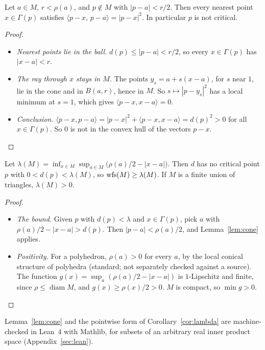 \begin{lemma}\label{lem:cone}
Let $a\in M$, $r<\rho(a)$, and $p\notin M$ with $|p-a|<r/2$. Then every nearest point $x\in\Gamma(p)$ satisfies
$\langle p-x,\,p-a\rangle=|p-x|^2$. In particular $p$ is not critical.
\end{lemma}
\begin{proof}
\begin{itemize}
\item \emph{Nearest points lie in the ball.} $d(p)\le|p-a|<r/2$, so every $x\in\Gamma(p)$ has $|x-a|<r$.
\item \emph{The ray through $x$ stays in $M$.} The points $y_s=a+s(x-a)$, for $s$ near $1$, lie in the cone and
in $B(a,r)$, hence in $M$. So $s\mapsto|p-y_s|^2$ has a local minimum at $s=1$, which gives $\langle
p-x,x-a\rangle=0$.
\item \emph{Conclusion.} $\langle p-x,p-a\rangle=|p-x|^2+\langle p-x,x-a\rangle=d(p)^2>0$ for all
$x\in\Gamma(p)$. So $0$ is not in the convex hull of the vectors $p-x$.
\end{itemize}
\end{proof}

\begin{corollary}\label{cor:lambda}
Let $\lambda(M)=\inf_{x\in M}\sup_{a\in M}\bigl(\rho(a)/2-|x-a|\bigr)$. Then $d$ has no critical point $p$ with
$0<d(p)<\lambda(M)$, so $\operatorname{wfs}(M)\ge\lambda(M)$. If $M$ is a finite union of triangles, $\lambda(M)>0$.
\end{corollary}
\begin{proof}
\begin{itemize}
\item \emph{The bound.} Given $p$ with $d(p)<\lambda$ and $x\in\Gamma(p)$, pick $a$ with
$\rho(a)/2-|x-a|>d(p)$. Then $|p-a|<\rho(a)/2$, and Lemma~\ref{lem:cone} applies.
\item \emph{Positivity.} For a polyhedron, $\rho(a)>0$ for every $a$, by the local conical structure of
polyhedra (standard; not separately checked against a source). The function $g(x)=\sup_a(\rho(a)/2-|x-a|)$
is $1$-Lipschitz and finite, since $\rho\le\operatorname{diam}M$, and $g(x)\ge\rho(x)/2>0$. $M$ is compact, so
$\min g>0$.
\end{itemize}
\end{proof}

Lemma~\ref{lem:cone} and the pointwise form of Corollary~\ref{cor:lambda} are machine-checked in Lean~4 with
Mathlib, for subsets of an arbitrary real inner product space (Appendix~\ref{sec:lean}).

